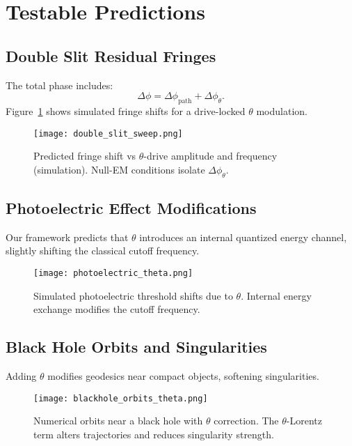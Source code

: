 \section{Testable Predictions}\label{sec:predictions}

\subsection{Double Slit Residual Fringes}
The total phase includes:
\begin{equation}
\Delta\phi = \Delta\phi_{\text{path}} + \Delta\phi_\theta.
\end{equation}
Figure~\ref{fig:double-slit-sweep} shows simulated fringe shifts for a drive-locked $\theta$ modulation.

\begin{figure}[h]
  \centering
  \texttt{[image: double\_slit\_sweep.png]}
  \caption{Predicted fringe shift vs $\theta$-drive amplitude and frequency (simulation).
  Null-EM conditions isolate $\Delta\phi_{\theta}$.}
  \label{fig:double-slit-sweep}
\end{figure}

\subsection{Photoelectric Effect Modifications}
Our framework predicts that $\theta$ introduces an internal quantized energy channel,
slightly shifting the classical cutoff frequency.

\begin{figure}[h]
  \centering
  \texttt{[image: photoelectric\_theta.png]}
  \caption{Simulated photoelectric threshold shifts due to $\theta$.
  Internal energy exchange modifies the cutoff frequency.}
  \label{fig:photoelectric-theta}
\end{figure}

\subsection{Black Hole Orbits and Singularities}
Adding $\theta$ modifies geodesics near compact objects, softening singularities.

\begin{figure}[h]
  \centering
  \texttt{[image: blackhole\_orbits\_theta.png]}
  \caption{Numerical orbits near a black hole with $\theta$ correction.
  The $\theta$-Lorentz term alters trajectories and reduces singularity strength.}
  \label{fig:blackhole-orbits}
\end{figure}

